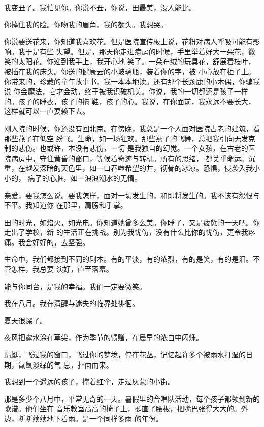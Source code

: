 		我变丑了。我怕见你。你说不丑，你说，田最美，没人能比。

		你捧住我的脸。你吻我的眉角，我的额头。我想哭。

		你说要送花来，你知道我喜欢花。但是医院宣传板上说，花粉对病人呼吸可能有影响。我于是有些
	失望。但是，那天你走进病房的时候，手里举着好大一朵花，微笑的太阳花。你递到我手上，我开心地
	笑了。一朵布绒的玩具花，舒展着枝叶，被插在我的床头。你送的健康云的小玻璃瓶，装着你的字，被
	小心放在柜子上。你带来的，珍藏的童年故事书，我一本本地读。还有那个长颈鹿的小木偶，你骗我说
	你会魔法，它才会动，终于被我识破机关。你说，我的一切都还是孩子一样的。孩子的睡衣，孩子的拖
	鞋，孩子的心。我说，在你面前，我永远不要长大，这样就可以一直耍赖下去。

		刚入院的时候，你还没有回北京。在傍晚，我总是一个人面对医院古老的建筑，看那些燕子在低空
	纷飞。生命，如一场狂欢。那些燕子的飞舞，总把我引向无发克制的悲伤。也或许，本没有悲伤，一切
	是我独自的幻觉。一个女孩，在古老的医院病房中，守住黄昏的窗口，等候着奇迹与转机。所有的思绪，
	都关乎命运。沉重，在越发深暗的天色里，如一口吞噬希望的井，彻骨的冰凉。恐惧，侵袭入我小小的，
	病了的心脏，如一浪浪潮水的无情。

		亲爱，要我怎么说。要我怎样，面对一切发生的，和即将发生的。我不该有怨恨与不平。我知道你
	在那里，肩膀和手掌。

		田的时光，如焰火，如光电。你知道她曾多么美。你睡了，又是疲惫的一天吧。你走出了学校，新
	的生活正在挑战。别为我忧伤，没有什么比你的忧伤，更令我疼痛。我会好好的，去坚强。

		生命中，我们都接到不同的剧本。有的平淡，有的浓烈，有的是笑，有的是泪。不管怎样，我总要
	演好，直至落幕。

		能与你同台，是我的幸福。我们一定要微笑。

	\endwriting



		我在八月。我在清醒与迷失的临界处徘徊。

		夏天很深了。

		夜风把露水涂在草尖，作为季节的馈赠，在晨早的浓白中闪烁。

		蜻蜓，飞过我的窗口，飞过你的梦境，停在花丛，记忆起许多个被雨水打湿的日期，氤氲淡绿的气
	息，扑面而来。

		我想到一个遥远的孩子，撑着红伞，走过灰蒙的小街。

		那是多少个八月中，平常无奇的一天。暑假里的合唱队活动，每个孩子都领到新的歌谱。他们坐在
	音乐教室高高的椅子上，挺直了腰板，把嘴巴张得大大的。外边，断断续续地下着雨。是一个同样多雨
	的年份。

